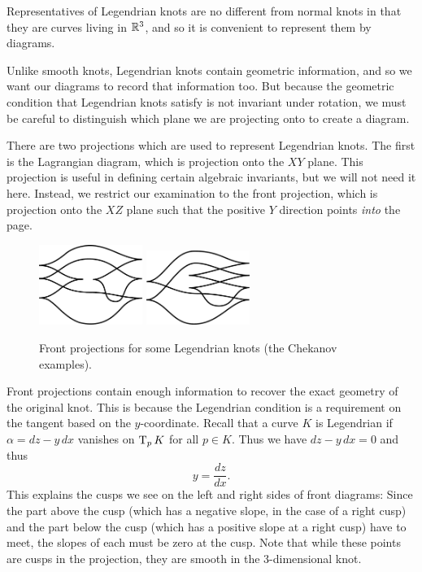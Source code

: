 Representatives of Legendrian knots are no different from normal knots in that they are curves living in $\mathbb{R}^3$, and so it is convenient to represent them by diagrams.

Unlike smooth knots, Legendrian knots contain geometric information, and so we want our diagrams to record that information too. But because the geometric condition that Legendrian knots satisfy is not invariant under rotation, we must be careful to distinguish which plane we are projecting onto to create a diagram.

There are two projections which are used to represent Legendrian knots. The first is the Lagrangian diagram, which is projection onto the $XY$ plane. This projection is useful in defining certain algebraic invariants, but we will not need it here.
Instead, we restrict our examination to the front projection, which is projection onto the $XZ$ plane such that the positive $Y$ direction points \emph{into} the page.

\begin{figure}[ht]
    \centering
    \includegraphics[width=0.3\textwidth]{images/chekanov-1.pdf}
    \hspace{2em}
    \includegraphics[width=0.3\textwidth]{images/chekanov-2.pdf}
    \caption{Front projections for some Legendrian knots (the Chekanov examples).}%
    \label{fig:front-projection}
\end{figure}

Front projections contain enough information to recover the exact geometry of the original knot. This is because the Legendrian condition is a requirement on the tangent based on the $y$-coordinate. Recall that a curve $K$ is Legendrian if $\alpha = dz - y\, dx$ vanishes on $\operatorname{T}_p K$ for all $p \in K$. Thus we have $dz - y \, dx = 0$ and thus
\[
    y = \frac{dz}{dx}.
\]
This explains the cusps we see on the left and right sides of front diagrams: Since the part above the cusp (which has a negative slope, in the case of a right cusp) and the part below the cusp (which has a positive slope at a right cusp) have to meet, the slopes of each must be zero at the cusp. Note that while these points are cusps in the projection, they are smooth in the 3-dimensional knot.

